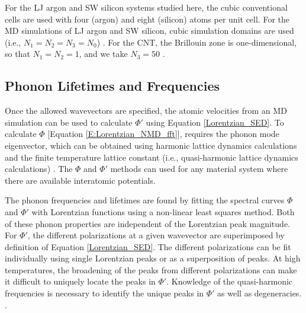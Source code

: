 For the LJ argon and SW silicon systems studied here, the cubic 
conventional cells are 
used with four (argon) and eight (silicon) atoms per unit cell. For the 
MD simulations of
 LJ argon and SW silicon, cubic simulation domains are used (i.e., 
 $N_1 = N_2 = N_3 = N_0$) 
\cite{mcgaughey_quantitative_2004,turney_predicting_2009,
sellan_size_2010}. For the CNT, the Brillouin 
zone is one-dimensional, 
so that $N_1 = N_2 = 1$, and we take $N_3=50$ 
\cite{thomas_predicting_2010}.


\subsection{\label{Subsection_Comp_Details_2}Phonon Lifetimes and 
Frequencies}
Once the allowed wavevectors are specified, the atomic velocities from 
an MD simulation can be used to calculate $\Phi'$ using Equation 
\eqref{Lorentzian_SED}. To calculate $\Phi$ 
[Equation \eqref{E:Lorentzian_NMD_fft}], 
requires the phonon mode eigenvector, which can be obtained using 
harmonic lattice dynamics calculations and the finite temperature 
lattice constant (i.e., quasi-harmonic lattice dynamics calculations) 
\cite{dove_introduction_1993,gale_general_2003}. 
The $\Phi$ and $\Phi'$ methods can used 
for any material system where there are 
available interatomic potentials.

The phonon frequencies and lifetimes are found by fitting the spectral 
curves $\Phi$ and $\Phi'$ with Lorentzian functions using a non-linear 
least squares method. Both of these 
phonon properties are independent of the Lorentzian peak magnitude. 
For $\Phi'$, the different polarizations at a given wavevector are 
superimposed by definition of Equation \eqref{Lorentzian_SED}. 
The different polarizations can be fit individually using single 
Lorentzian peaks or as a superposition of peaks. At high temperatures, 
the broadening of the peaks from different polarizations can make it 
difficult to uniquely locate the peaks in $\Phi'$. Knowledge of the 
quasi-harmonic frequencies is necessary to identify the unique peaks in 
$\Phi'$ as well as degeneracies.
\cite{mcgaughey_phonon_2006,turney_predicting_2009}.

